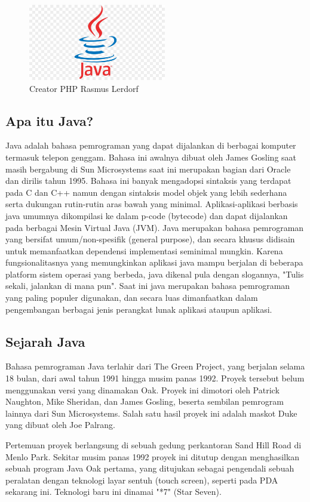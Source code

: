 	\begin{figure}[H]
		\includegraphics[width=6cm]{figures/web/javalogo.jpg}
		\centering
		\caption{Creator PHP Rasmus Lerdorf }
	\end{figure}
\subsection{Apa itu Java?}
Java adalah bahasa pemrograman yang dapat dijalankan di berbagai komputer termasuk telepon genggam. Bahasa ini awalnya dibuat oleh James Gosling saat masih bergabung di Sun Microsystems saat ini merupakan bagian dari Oracle dan dirilis tahun 1995. Bahasa ini banyak mengadopsi sintaksis yang terdapat pada C dan C++ namun dengan sintaksis model objek yang lebih sederhana serta dukungan rutin-rutin aras bawah yang minimal. Aplikasi-aplikasi berbasis java umumnya dikompilasi ke dalam p-code (bytecode) dan dapat dijalankan pada berbagai Mesin Virtual Java (JVM). Java merupakan bahasa pemrograman yang bersifat umum/non-spesifik (general purpose), dan secara khusus didisain untuk memanfaatkan dependensi implementasi seminimal mungkin. Karena fungsionalitasnya yang memungkinkan aplikasi java mampu berjalan di beberapa platform sistem operasi yang berbeda, java dikenal pula dengan slogannya, "Tulis sekali, jalankan di mana pun". Saat ini java merupakan bahasa pemrograman yang paling populer digunakan, dan secara luas dimanfaatkan dalam pengembangan berbagai jenis perangkat lunak aplikasi ataupun aplikasi.

\subsection{Sejarah Java}
Bahasa pemrograman Java terlahir dari The Green Project, yang berjalan selama 18 bulan, dari awal tahun 1991 hingga musim panas 1992. Proyek tersebut belum menggunakan versi yang dinamakan Oak. Proyek ini dimotori oleh Patrick Naughton, Mike Sheridan, dan James Gosling, beserta sembilan pemrogram lainnya dari Sun Microsystems. Salah satu hasil proyek ini adalah maskot Duke yang dibuat oleh Joe Palrang.

Pertemuan proyek berlangsung di sebuah gedung perkantoran Sand Hill Road di Menlo Park. Sekitar musim panas 1992 proyek ini ditutup dengan menghasilkan sebuah program Java Oak pertama, yang ditujukan sebagai pengendali sebuah peralatan dengan teknologi layar sentuh (touch screen), seperti pada PDA sekarang ini. Teknologi baru ini dinamai "*7" (Star Seven).

